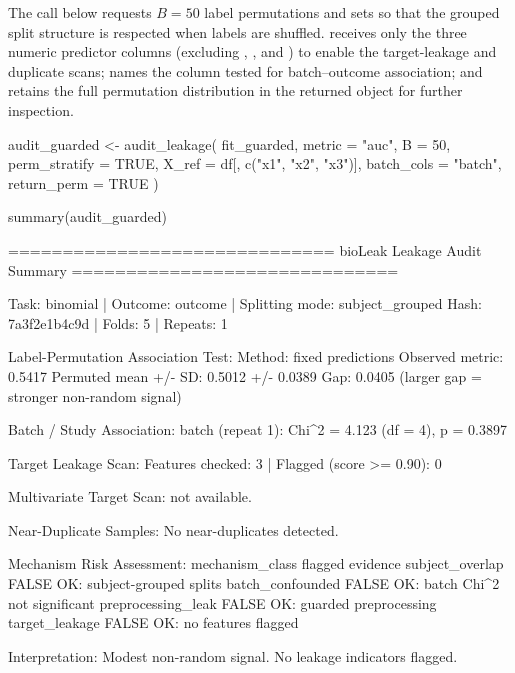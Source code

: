 \documentclass[article,shortnames]{jss}
\begin{document}
The call below requests $B = 50$ label permutations and sets  so that the grouped split structure is respected when labels are shuffled.  receives only the three numeric predictor columns (excluding , , and ) to enable the target-leakage and duplicate scans;  names the column tested for batch--outcome association; and  retains the full permutation distribution in the returned object for further inspection.

\begin{CodeInput}
audit_guarded <- audit_leakage(
  fit_guarded,
  metric = "auc",
  B = 50,
  perm_stratify = TRUE,
  X_ref = df[, c("x1", "x2", "x3")],
  batch_cols = "batch",
  return_perm = TRUE
)

summary(audit_guarded)
\end{CodeInput}
\begin{CodeOutput}
==============================
 bioLeak Leakage Audit Summary
==============================

Task: binomial | Outcome: outcome | Splitting mode: subject_grouped
Hash: 7a3f2e1b4c9d | Folds: 5 | Repeats: 1

Label-Permutation Association Test:
  Method: fixed predictions
  Observed metric: 0.5417
  Permuted mean +/- SD: 0.5012 +/- 0.0389
  Gap: 0.0405 (larger gap = stronger non-random signal)

Batch / Study Association:
  batch (repeat 1): Chi^2 = 4.123 (df = 4), p = 0.3897

Target Leakage Scan:
  Features checked: 3 | Flagged (score >= 0.90): 0

Multivariate Target Scan: not available.

Near-Duplicate Samples:
  No near-duplicates detected.

Mechanism Risk Assessment:
  mechanism_class      flagged evidence
  subject_overlap      FALSE   OK: subject-grouped splits
  batch_confounded     FALSE   OK: batch Chi^2 not significant
  preprocessing_leak   FALSE   OK: guarded preprocessing
  target_leakage       FALSE   OK: no features flagged

Interpretation:
  Modest non-random signal. No leakage indicators flagged.
\end{CodeOutput}
\end{document}
